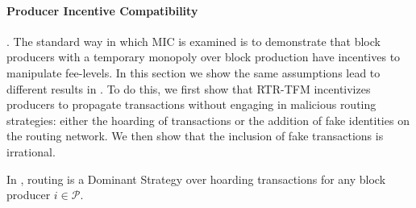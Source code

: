 \paragraph{Producer Incentive Compatibility}. The standard way in which MIC is examined is to demonstrate that block producers with a temporary monopoly over block production have incentives to manipulate fee-levels. In this section we show the same assumptions lead to different results in \ourTFM. To do this, we first show that RTR-TFM incentivizes producers to propagate transactions without engaging in malicious routing strategies: either the hoarding of transactions or the addition of fake identities on the routing network. We then show that the inclusion of fake transactions is irrational.

\begin{lemma}\label{lemma:routing}
    In \ourTFM, routing is a Dominant Strategy over hoarding transactions for any block producer $i\in\mathcal{P}$. 
\end{lemma} 
